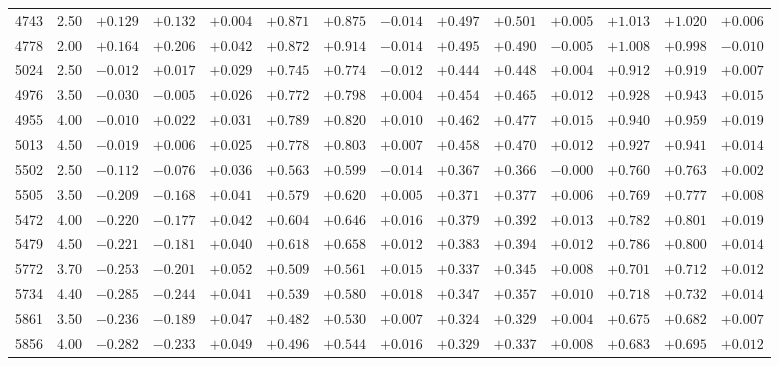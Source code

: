 \documentclass[]{aa}
\begin{document}
\begin{appendix}
\begin{table*}
\begin{center}
\begin{tabular}{llllllllllllll}
4743  &2.50& $ +0.129$&$  +0.132$&$  +0.004$&$  +0.871$&$  +0.875$&$  -0.014$&$  +0.497$&$  +0.501$&$  +0.005$&$  +1.013$&$  +1.020$&$  +0.006$\\
4778  &2.00& $ +0.164$&$  +0.206$&$  +0.042$&$  +0.872$&$  +0.914$&$  -0.014$&$  +0.495$&$  +0.490$&$  -0.005$&$  +1.008$&$  +0.998$&$  -0.010$\\
5024  &2.50& $ -0.012$&$  +0.017$&$  +0.029$&$  +0.745$&$  +0.774$&$  -0.012$&$  +0.444$&$  +0.448$&$  +0.004$&$  +0.912$&$  +0.919$&$  +0.007$\\
4976  &3.50& $ -0.030$&$  -0.005$&$  +0.026$&$  +0.772$&$  +0.798$&$  +0.004$&$  +0.454$&$  +0.465$&$  +0.012$&$  +0.928$&$  +0.943$&$  +0.015$\\
4955  &4.00& $ -0.010$&$  +0.022$&$  +0.031$&$  +0.789$&$  +0.820$&$  +0.010$&$  +0.462$&$  +0.477$&$  +0.015$&$  +0.940$&$  +0.959$&$  +0.019$\\
5013  &4.50& $ -0.019$&$  +0.006$&$  +0.025$&$  +0.778$&$  +0.803$&$  +0.007$&$  +0.458$&$  +0.470$&$  +0.012$&$  +0.927$&$  +0.941$&$  +0.014$\\
5502  &2.50& $ -0.112$&$  -0.076$&$  +0.036$&$  +0.563$&$  +0.599$&$  -0.014$&$  +0.367$&$  +0.366$&$  -0.000$&$  +0.760$&$  +0.763$&$  +0.002$\\
5505  &3.50& $ -0.209$&$  -0.168$&$  +0.041$&$  +0.579$&$  +0.620$&$  +0.005$&$  +0.371$&$  +0.377$&$  +0.006$&$  +0.769$&$  +0.777$&$  +0.008$\\
5472  &4.00& $ -0.220$&$  -0.177$&$  +0.042$&$  +0.604$&$  +0.646$&$  +0.016$&$  +0.379$&$  +0.392$&$  +0.013$&$  +0.782$&$  +0.801$&$  +0.019$\\
5479  &4.50& $ -0.221$&$  -0.181$&$  +0.040$&$  +0.618$&$  +0.658$&$  +0.012$&$  +0.383$&$  +0.394$&$  +0.012$&$  +0.786$&$  +0.800$&$  +0.014$\\
5772  &3.70& $ -0.253$&$  -0.201$&$  +0.052$&$  +0.509$&$  +0.561$&$  +0.015$&$  +0.337$&$  +0.345$&$  +0.008$&$  +0.701$&$  +0.712$&$  +0.012$\\
5734  &4.40& $ -0.285$&$  -0.244$&$  +0.041$&$  +0.539$&$  +0.580$&$  +0.018$&$  +0.347$&$  +0.357$&$  +0.010$&$  +0.718$&$  +0.732$&$  +0.014$\\
5861  &3.50& $ -0.236$&$  -0.189$&$  +0.047$&$  +0.482$&$  +0.530$&$  +0.007$&$  +0.324$&$  +0.329$&$  +0.004$&$  +0.675$&$  +0.682$&$  +0.007$\\
5856  &4.00& $ -0.282$&$  -0.233$&$  +0.049$&$  +0.496$&$  +0.544$&$  +0.016$&$  +0.329$&$  +0.337$&$  +0.008$&$  +0.683$&$  +0.695$&$  +0.012$\\

\end{tabular}
\end{center}
\end{table*}
\end{appendix}
\end{document}
